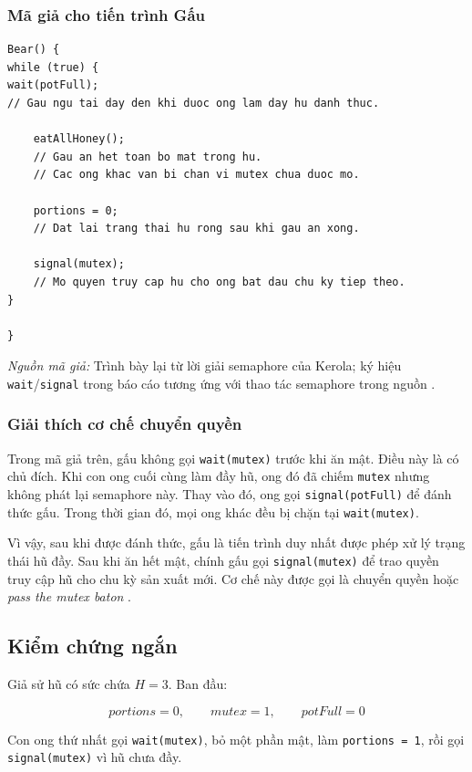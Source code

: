\subsubsection*{Mã giả cho tiến trình Gấu}

\begin{lstlisting}
Bear() {
while (true) {
wait(potFull);
// Gau ngu tai day den khi duoc ong lam day hu danh thuc.

    eatAllHoney();
    // Gau an het toan bo mat trong hu.
    // Cac ong khac van bi chan vi mutex chua duoc mo.

    portions = 0;
    // Dat lai trang thai hu rong sau khi gau an xong.

    signal(mutex);
    // Mo quyen truy cap hu cho ong bat dau chu ky tiep theo.
}

}
\end{lstlisting}

\noindent
\textit{Nguồn mã giả:} Trình bày lại từ lời giải semaphore của Kerola;
ký hiệu \texttt{wait}/\texttt{signal} trong báo cáo tương ứng với thao
tác semaphore trong nguồn
\cite[Slides~13--15]{kerola2012}.

\subsubsection*{Giải thích cơ chế chuyển quyền}

Trong mã giả trên, gấu không gọi \texttt{wait(mutex)} trước khi ăn mật.
Điều này là có chủ đích. Khi con ong cuối cùng làm đầy hũ, ong đó đã
chiếm \texttt{mutex} nhưng không phát lại semaphore này. Thay vào đó,
ong gọi \texttt{signal(potFull)} để đánh thức gấu. Trong thời gian đó,
mọi ong khác đều bị chặn tại \texttt{wait(mutex)}.

Vì vậy, sau khi được đánh thức, gấu là tiến trình duy nhất được phép xử
lý trạng thái hũ đầy. Sau khi ăn hết mật, chính gấu gọi
\texttt{signal(mutex)} để trao quyền truy cập hũ cho chu kỳ sản xuất
mới. Cơ chế này được gọi là chuyển quyền hoặc
\textit{pass the mutex baton}
\cite[Slides~13--15]{kerola2012}.

\subsection{Kiểm chứng ngắn}

Giả sử hũ có sức chứa $H = 3$. Ban đầu:

\[
portions = 0, \qquad mutex = 1, \qquad potFull = 0
\]

Con ong thứ nhất gọi \texttt{wait(mutex)}, bỏ một phần mật, làm
\texttt{portions = 1}, rồi gọi \texttt{signal(mutex)} vì hũ chưa đầy.

